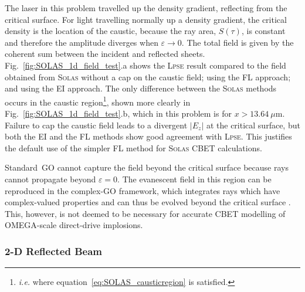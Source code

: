 The laser in this problem travelled up the density gradient, reflecting from the critical surface.
For light travelling normally up a density gradient, the critical density is the location of the caustic, because the ray area, $S(\tau)$, is constant and therefore the amplitude diverges when $\varepsilon\rightarrow 0$.
The total field is given by the coherent sum between the incident and reflected sheets.
Fig.~\ref{fig:SOLAS_1d_field_test}.a shows the \textsc{Lpse} result compared to the field obtained from \textsc{Solas} without a cap on the caustic field; using the \ac{FL} approach; and using the \ac{EI} approach.
The only difference between the \textsc{Solas} methods occurs in the caustic region\footnote{\textit{i.e.} where equation~\ref{eq:SOLAS_causticregion} is satisfied.}, shown more clearly in Fig.~\ref{fig:SOLAS_1d_field_test}.b, which in this problem is for $x>13.64\ \mu\text{m}$.
Failure to cap the caustic field leads to a divergent $|E_z|$ at the critical surface, but both the \ac{EI} and the \ac{FL} methods show good agreement with \textsc{Lpse}.
This justifies the default use of the simpler \ac{FL} method for \textsc{Solas} \ac{CBET} calculations.

Standard~\ac{GO} cannot capture the field beyond the critical surface because rays cannot propagate beyond $\varepsilon=0$.
The evanescent field in this region can be reproduced in the complex-\ac{GO} framework, which integrates rays which have complex-valued properties and can thus be evolved beyond the critical surface \cite{colaitis_real_2019}.
This, however, is not deemed to be necessary for accurate \ac{CBET} modelling of OMEGA-scale direct-drive implosions.

\subsubsection{2-D Reflected Beam}


